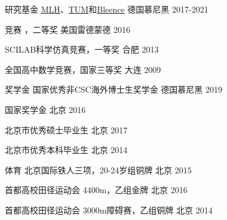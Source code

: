 




\begin{cvhonors}



\cvhonor
{研究基金} %
{\href{https://fellowship.mlh.io/}{MLH}、\href{}{TUM}和\href{https://bleenco.com/}{Bleence}} %
{德国慕尼黑} %
{2017-2021} %


\cvhonor
{竞赛} %
{\href{https://www.microsoft.com/en-us/research/academic-program/microsoft-open-source-challenge/}{}，二等奖} %
{美国雷德蒙德} %
{2016} %

\cvhonor
{} %
{SCILAB科学仿真竞赛，一等奖} %
{合肥} %
{2013} %


\cvhonor
{} %
{全国高中数学竞赛，国家三等奖} %
{大连} %
{2009} %

\cvhonor
{奖学金} %
{国家优秀非CSC海外博士生奖学金} %
{德国慕尼黑} %
{2019} %

\cvhonor
{} %
{国家奖学金} %
{北京} %
{2016} %

\cvhonor
{} %
{北京市优秀硕士毕业生} %
{北京} %
{2017} %

\cvhonor
{} %
{北京市优秀本科毕业生} %
{北京} %
{2014} %


\cvhonor
{体育} %
{北京国际铁人三项，20-24岁组铜牌} %
{北京} %
{2015} %

\cvhonor
{} %
{首都高校田径运动会 4\times400m，乙组金牌} %
{北京} %
{2016} %

\cvhonor
{} %
{首都高校田径运动会 3000m障碍赛，乙组铜牌} %
{北京} %
{2014} %


\end{cvhonors}

